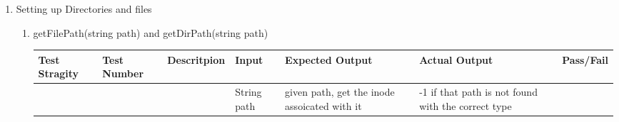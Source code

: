 \documentclass{article}
\begin{document}
\begin{enumerate}
\begin{enumerate}
\begin{enumerate}
\end{enumerate}
\end{enumerate}
\item Setting up Directories and files
\label{sec:org3d724d0}
\begin{enumerate}
\item getFilePath(string path) and getDirPath(string path)
\label{sec:org9a2ce2d}
\begin{center}
\begin{tabular}{lllllll}
Test Stragity & Test Number & Descritpion & Input & Expected Output & Actual Output & Pass/Fail\\
\hline
 &  &  & String path & given path, get the inode assoicated with it & -1 if that path is not found with the correct type & \\
\end{tabular}
\end{center}


\end{enumerate}
\end{enumerate}
\end{document}
